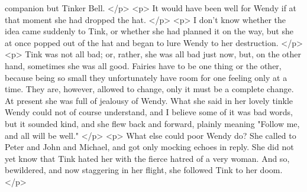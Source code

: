       companion but Tinker Bell.
    </p>
    <p>
      It would have been well for Wendy if at that moment she had dropped the
      hat.
    </p>
    <p>
      I don't know whether the idea came suddenly to Tink, or whether she had
      planned it on the way, but she at once popped out of the hat and began to
      lure Wendy to her destruction.
    </p>
    <p>
      Tink was not all bad; or, rather, she was all bad just now, but, on the
      other hand, sometimes she was all good. Fairies have to be one thing or
      the other, because being so small they unfortunately have room for one
      feeling only at a time. They are, however, allowed to change, only it must
      be a complete change. At present she was full of jealousy of Wendy. What
      she said in her lovely tinkle Wendy could not of course understand, and I
      believe some of it was bad words, but it sounded kind, and she flew back
      and forward, plainly meaning "Follow me, and all will be well."
    </p>
    <p>
      What else could poor Wendy do? She called to Peter and John and Michael,
      and got only mocking echoes in reply. She did not yet know that Tink hated
      her with the fierce hatred of a very woman. And so, bewildered, and now
      staggering in her flight, she followed Tink to her doom.
    </p>
